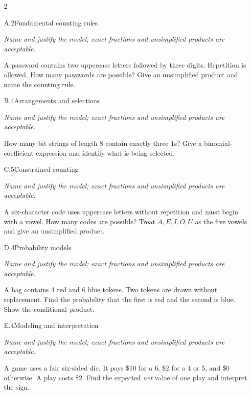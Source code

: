\documentclass[9pt]{extarticle}
\begin{document}
\CoreWorkArea
\FormBreak
{}
\begin{multicols}{2}
\begin{CoreProblem}{A.2}{Fundamental counting rules}
{\scriptsize\textit{Name and justify the model; exact fractions and unsimplified products are acceptable.}\par}
A password contains two uppercase letters followed by three digits.
    Repetition is allowed. How many passwords are possible? Give an unsimplified
    product and name the counting rule.
\end{CoreProblem}
\begin{CoreProblem}{B.4}{Arrangements and selections}
{\scriptsize\textit{Name and justify the model; exact fractions and unsimplified products are acceptable.}\par}
How many bit strings of length 8 contain exactly three $1$s? Give a
    binomial-coefficient expression and identify what is being selected.
\end{CoreProblem}
\begin{CoreProblem}{C.5}{Constrained counting}
{\scriptsize\textit{Name and justify the model; exact fractions and unsimplified products are acceptable.}\par}
A six-character code uses uppercase letters without repetition and
    must begin with a vowel. How many codes are possible? Treat
    $A,E,I,O,U$ as the five vowels and give an unsimplified product.
\end{CoreProblem}
\columnbreak
\begin{CoreProblem}{D.4}{Probability models}
{\scriptsize\textit{Name and justify the model; exact fractions and unsimplified products are acceptable.}\par}
A bag contains 4 red and 6 blue tokens. Two tokens are drawn without
    replacement. Find the probability that the first is red and the second is
    blue. Show the conditional product.
\end{CoreProblem}
\begin{CoreProblem}{E.4}{Modeling and interpretation}
{\scriptsize\textit{Name and justify the model; exact fractions and unsimplified products are acceptable.}\par}
A game uses a fair six-sided die. It pays \$10 for a 6, \$2 for a 4
    or 5, and \$0 otherwise. A play costs \$2. Find the expected \emph{net}
    value of one play and interpret the sign.
\end{CoreProblem}
\end{multicols}
\end{document}
